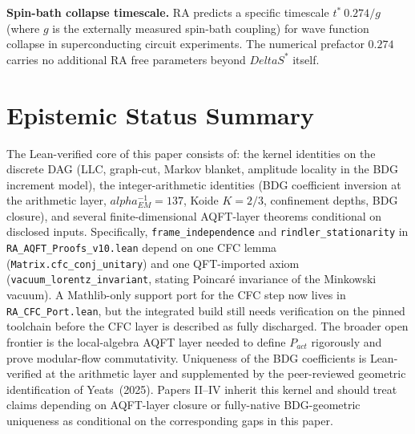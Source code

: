 \documentclass[11pt]{article}
\def\Delta{Delta}%
\def\alpha{alpha}%
\def\mathrm#1{#1}%
\def\approx{~}%
\begin{document}
\textbf{Spin-bath collapse timescale.} RA predicts a specific timescale $t^*\approx 0.274/g$ (where $g$ is the externally measured spin-bath coupling) for wave function collapse in superconducting circuit experiments. The numerical prefactor $0.274$ carries no additional RA free parameters beyond $\Delta S^*$ itself.

\section{Epistemic Status Summary}
\label{sec:status}

\begin{tcolorbox}[title=Scope of the Lean-verified layer,colback=gray!5,colframe=gray!60]
The Lean-verified core of this paper consists of: the kernel identities on the discrete DAG (LLC, graph-cut, Markov blanket, amplitude locality in the BDG increment model), the integer-arithmetic identities (BDG coefficient inversion at the arithmetic layer, $\alpha_{\mathrm{EM}}^{-1}=137$, Koide $K=2/3$, confinement depths, BDG closure), and several finite-dimensional AQFT-layer theorems conditional on disclosed inputs. Specifically, \texttt{frame\_independence} and \texttt{rindler\_stationarity} in \texttt{RA\_AQFT\_Proofs\_v10.lean} depend on one CFC lemma (\texttt{Matrix.cfc\_conj\_unitary}) and one QFT-imported axiom (\texttt{vacuum\_lorentz\_invariant}, stating Poincar\'e invariance of the Minkowski vacuum). A Mathlib-only support port for the CFC step now lives in \texttt{RA\_CFC\_Port.lean}, but the integrated build still needs verification on the pinned toolchain before the CFC layer is described as fully discharged. The broader open frontier is the local-algebra AQFT layer needed to define \(P_{\mathrm{act}}\) rigorously and prove modular-flow commutativity. Uniqueness of the BDG coefficients is Lean-verified at the arithmetic layer and supplemented by the peer-reviewed geometric identification of Yeats~(2025). Papers II--IV inherit this kernel and should treat claims depending on AQFT-layer closure or fully-native BDG-geometric uniqueness as conditional on the corresponding gaps in this paper.
\end{tcolorbox}
\end{document}
